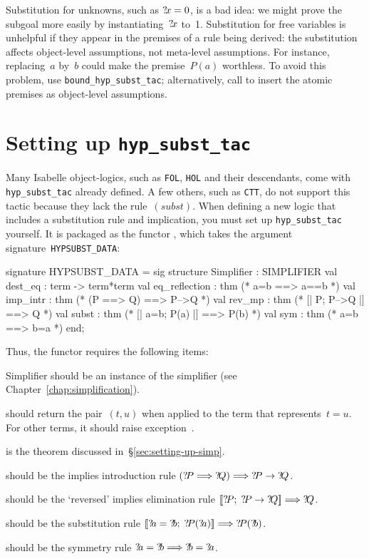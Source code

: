 Substitution for unknowns, such as ${?\!x}=0$, is a bad idea: we might prove
the subgoal more easily by instantiating~${?\!x}$ to~1.
Substitution for free variables is unhelpful if they appear in the
premises of a rule being derived: the substitution affects object-level
assumptions, not meta-level assumptions.  For instance, replacing~$a$
by~$b$ could make the premise~$P(a)$ worthless.  To avoid this problem, use
{\tt bound_hyp_subst_tac}; alternatively, call  to
insert the atomic premises as object-level assumptions.


\section{Setting up {\tt hyp_subst_tac}} 
Many Isabelle object-logics, such as {\tt FOL}, {\tt HOL} and their
descendants, come with {\tt hyp_subst_tac} already defined.  A few others,
such as {\tt CTT}, do not support this tactic because they lack the
rule~$(subst)$.  When defining a new logic that includes a substitution
rule and implication, you must set up {\tt hyp_subst_tac} yourself.  It
is packaged as the \ML{} functor , which takes the
argument signature~{\tt HYPSUBST_DATA}:
\begin{ttbox} 
signature HYPSUBST_DATA =
  sig
  structure Simplifier : SIMPLIFIER
  val dest_eq          : term -> term*term
  val eq_reflection    : thm             (* a=b ==> a==b *)
  val imp_intr         : thm             (* (P ==> Q) ==> P-->Q *)
  val rev_mp           : thm             (* [| P;  P-->Q |] ==> Q *)
  val subst            : thm             (* [| a=b;  P(a) |] ==> P(b) *)
  val sym              : thm             (* a=b ==> b=a *)
  end;
\end{ttbox}
Thus, the functor requires the following items:
\begin{ttdescription}
\item[Simplifier] should be an instance of the simplifier (see
  Chapter~\ref{chap:simplification}).

\item[\ttindexbold{dest_eq}] should return the pair~$(t,u)$ when
applied to the \ML{} term that represents~$t=u$.  For other terms, it
should raise exception~.

\item[\tdxbold{eq_reflection}] is the theorem discussed
  in~\S\ref{sec:setting-up-simp}. 

\item[\tdxbold{imp_intr}] should be the implies introduction
rule $({?\!P}\Longrightarrow{?\!Q})\Longrightarrow {?\!P}\rightarrow{?\!Q}$.

\item[\tdxbold{rev_mp}] should be the `reversed' implies elimination
rule $\mathopen{[\![}{?\!P};  \;{?\!P}\rightarrow{?\!Q}\mathclose{]\!]} \Longrightarrow {?\!Q}$.

\item[\tdxbold{subst}] should be the substitution rule
$\List{\Var{a}=\Var{b};\; \Var{P}(\Var{a})} \Imp \Var{P}(\Var{b})$.

\item[\tdxbold{sym}] should be the symmetry rule
${?\!a}={?\!b}\Longrightarrow{?\!b}={?\!a}$.
\end{ttdescription}
